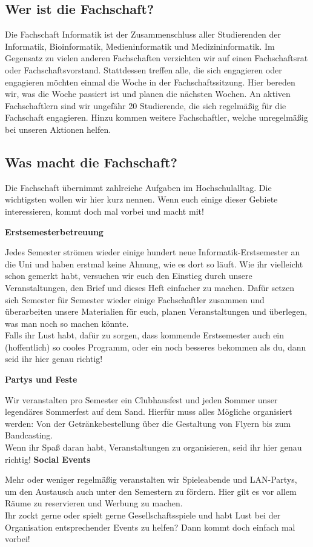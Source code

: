 \subsection{Wer ist die Fachschaft?}
Die Fachschaft Informatik ist der Zusammenschluss aller Studierenden der Informatik, Bioinformatik, Medieninformatik und Medizininformatik. Im Gegensatz zu vielen anderen Fachschaften verzichten wir auf einen Fachschaftsrat oder Fachschaftsvorstand. Stattdessen treffen alle, die sich engagieren oder engagieren möchten einmal die Woche in der Fachschaftssitzung. Hier bereden wir, was die Woche passiert ist und planen die nächsten Wochen. An aktiven Fachschaftlern sind wir ungefähr 20 Studierende, die sich regelmäßig für die Fachschaft engagieren. Hinzu kommen weitere Fachschaftler, welche unregelmäßig bei unseren Aktionen helfen.
\subsection{Was macht die Fachschaft?}
Die Fachschaft übernimmt zahlreiche Aufgaben im Hochschulalltag. Die wichtigsten wollen wir hier kurz nennen. Wenn euch einige dieser Gebiete interessieren, kommt doch mal vorbei und macht mit!

\textbf{Erstsemesterbetreuung}

Jedes Semester strömen wieder einige hundert neue Informatik-Erstsemester an die Uni und haben erstmal keine Ahnung, wie es dort so läuft. Wie ihr vielleicht schon gemerkt habt, versuchen wir euch den Einstieg durch unsere Veranstaltungen, den Brief und dieses Heft einfacher zu machen. Dafür setzen sich Semester für Semester wieder einige Fachschaftler zusammen und überarbeiten unsere Materialien für euch, planen Veranstaltungen und überlegen, was man noch so machen könnte.\\
Falls ihr Lust habt, dafür zu sorgen, dass kommende Erstsemester auch ein (hoffentlich) so cooles Programm, oder ein noch besseres bekommen als du, dann seid ihr hier genau richtig!

\textbf{Partys und Feste}

Wir veranstalten pro Semester ein Clubhausfest und jeden Sommer unser legendäres Sommerfest auf dem Sand. Hierfür muss alles Mögliche organisiert werden: Von der Getränkebestellung über die Gestaltung von Flyern bis zum Bandcasting. \\
Wenn ihr Spaß daran habt, Veranstaltungen zu organisieren, seid ihr hier genau richtig!
\vfill \pagebreak
\textbf{Social Events}

Mehr oder weniger regelmäßig veranstalten wir Spieleabende und LAN-Partys, um den Austausch auch unter den Semestern zu fördern. Hier gilt es vor allem Räume zu reservieren und Werbung zu machen. \\
Ihr zockt gerne oder spielt gerne Gesellschaftsspiele und habt Lust bei der Organisation entsprechender Events zu helfen? Dann kommt doch einfach mal vorbei!

